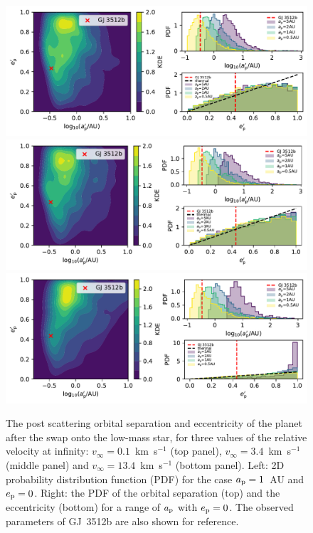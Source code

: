 \documentclass[twocolumn]{aastex62}
\begin{document}
\begin{figure}
\includegraphics[width=2\columnwidth]{letter-new-ae-01}\\
\includegraphics[width=2\columnwidth]{letter-new-ae-34}\\
 \includegraphics[width=2\columnwidth]{letter-new-ae-13}
  \caption{The post scattering orbital separation and eccentricity of the planet after the swap onto the low-mass star, for three values of the relative velocity at infinity: $v_\infty=0.1$~km~s$^{-1}$ (top panel), $v_\infty=3.4$~km~s$^{-1}$ (middle panel) and $v_\infty={13.4}$~km~s$^{-1}$ (bottom panel). 
  Left: 2D probability distribution function (PDF) for the case $a_{\rm p}=1$~AU and $e_{\rm p}=0$. Right: the PDF of the orbital separation (top) and the eccentricity (bottom) for a range of $a_{\rm p}$ with $e_{\rm p}=0$. The observed parameters of GJ~3512b are also shown for reference. }
 \label{fig:orbits}
\end{figure}
\end{document}
